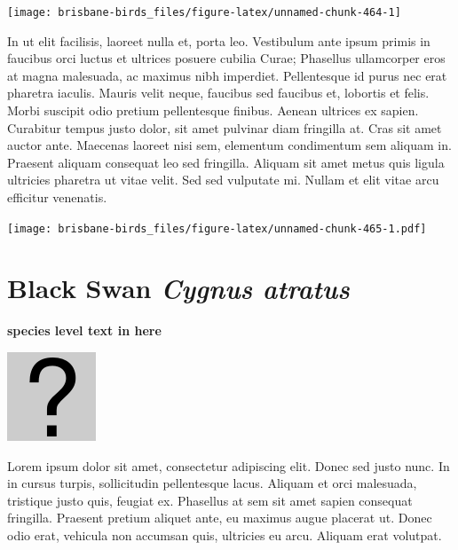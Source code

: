 \documentclass[]{book}
\let\origfigure\figure
\let\endorigfigure\endfigure
\renewenvironment{figure}[1][2] {
  \expandafter\origfigure\expandafter[H]
} {
  \endorigfigure
}
\begin{document}
\begin{figure}
\texttt{[image: brisbane-birds\_files/figure-latex/unnamed-chunk-464-1]} \caption{insert figure caption}\label{fig:unnamed-chunk-464}
\end{figure}

In ut elit facilisis, laoreet nulla et, porta leo. Vestibulum ante ipsum
primis in faucibus orci luctus et ultrices posuere cubilia Curae;
Phasellus ullamcorper eros at magna malesuada, ac maximus nibh
imperdiet. Pellentesque id purus nec erat pharetra iaculis. Mauris velit
neque, faucibus sed faucibus et, lobortis et felis. Morbi suscipit odio
pretium pellentesque finibus. Aenean ultrices ex sapien. Curabitur
tempus justo dolor, sit amet pulvinar diam fringilla at. Cras sit amet
auctor ante. Maecenas laoreet nisi sem, elementum condimentum sem
aliquam in. Praesent aliquam consequat leo sed fringilla. Aliquam sit
amet metus quis ligula ultricies pharetra ut vitae velit. Sed sed
vulputate mi. Nullam et elit vitae arcu efficitur venenatis.

\begin{figure}
\centering
\texttt{[image: brisbane-birds\_files/figure-latex/unnamed-chunk-465-1.pdf]}
\caption{\label{fig:unnamed-chunk-465}insert figure caption}
\end{figure}

\section{\texorpdfstring{Black Swan \emph{Cygnus
atratus}}{Black Swan Cygnus atratus}}\label{black-swan-cygnus-atratus}

\textbf{species level text in here}

\begin{figure}
\centering
\includegraphics{assets/missing.png}
\caption{No image for species}
\end{figure}

Lorem ipsum dolor sit amet, consectetur adipiscing elit. Donec sed justo
nunc. In in cursus turpis, sollicitudin pellentesque lacus. Aliquam et
orci malesuada, tristique justo quis, feugiat ex. Phasellus at sem sit
amet sapien consequat fringilla. Praesent pretium aliquet ante, eu
maximus augue placerat ut. Donec odio erat, vehicula non accumsan quis,
ultricies eu arcu. Aliquam erat volutpat.
\end{document}
